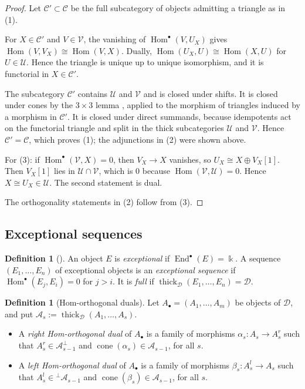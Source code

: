 \documentclass[11pt,reqno]{amsart}
\theoremstyle{plain}
\theoremstyle{definition}
\newtheorem{definition}[theorem]{Definition}
\theoremstyle{remark}
\newcommand{\kk}{\Bbbk}
\DeclareMathOperator{\Hom}{Hom}
\DeclareMathOperator{\End}{End}
\DeclareMathOperator{\cone}{cone}
\newcommand{\thick}[2][\cD]{\operatorname{thick}_{#1}(#2)}
\newcommand{\cD}{\mathcal{D}}
\newcommand{\cA}{\mathcal{A}}
\newcommand{\cC}{\mathcal{C}}
\newcommand{\cU}{\mathcal{U}}
\newcommand{\cV}{\mathcal{V}}
\begin{document}
\begin{proof}
Let $\cC'\subset\cC$ be the full subcategory of objects admitting a triangle as in (1).

For $X\in\cC'$ and $V\in\cV$, the vanishing of $\Hom^\bullet(V,U_X)$ gives $\Hom(V,V_X)\cong\Hom(V,X)$. Dually, $\Hom(U_X,U)\cong\Hom(X,U)$ for $U\in\cU$. Hence the triangle is unique up to unique isomorphism, and it is functorial in $X\in\cC'$.

The subcategory $\cC'$ contains $\cU$ and $\cV$ and is closed under shifts. It is closed under cones by the $3\times3$ lemma \cite[Prop.~1.1.11]{BBD82}, applied to the morphism of triangles induced by a morphism in $\cC'$. It is closed under direct summands, because idempotents act on the functorial triangle and split in the thick subcategories $\cU$ and $\cV$. Hence $\cC'=\cC$, which proves (1); the adjunctions in (2) were shown above.

For (3): if $\Hom^\bullet(\cV,X)=0$, then $V_X\to X$ vanishes, so $U_X\cong X\oplus V_X[1]$. Then $V_X[1]$ lies in $\cU\cap\cV$, which is $0$ because $\Hom(\cV,\cU)=0$. Hence $X\cong U_X\in\cU$. The second statement is dual.

The orthogonality statements in (2) follow from (3).
\end{proof}

\subsection{Exceptional sequences}

\begin{definition}[{\cite{Bon89}}]\label{def:exc}
An object $E$ is \emph{exceptional} if $\End^\bullet(E)=\kk$. A sequence $(E_1,\dots,E_n)$ of exceptional objects is an \emph{exceptional sequence} if $\Hom^\bullet(E_j,E_i)=0$ for $j>i$. It is \emph{full} if $\thick{E_1,\dots,E_n}=\cD$.
\end{definition}

\begin{definition}[Hom-orthogonal duals]\label{def:orth-dual}
Let $A_\bullet=(A_1,\dots,A_m)$ be objects of $\cD$, and put $\cA_s:=\thick{A_1,\dots,A_s}$.
\begin{itemize}
\item A \emph{right Hom-orthogonal dual} of $A_\bullet$ is a family of morphisms $\alpha_s\colon A_s\to A^r_s$ such that $A^r_s\in\cA_{s-1}^\perp$ and $\cone(\alpha_s)\in\cA_{s-1}$, for all $s$.
\item A \emph{left Hom-orthogonal dual} of $A_\bullet$ is a family of morphisms $\beta_s\colon A^l_s\to A_s$ such that $A^l_s\in{}^\perp\cA_{s-1}$ and $\cone(\beta_s)\in\cA_{s-1}$, for all $s$.
\end{itemize}
\end{definition}
\end{document}
